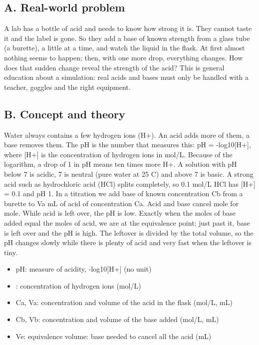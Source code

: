 \documentclass[11pt,a4paper]{article}
\begin{document}
\subsection*{A. Real-world problem}
A lab has a bottle of acid and needs to know how strong it is. They cannot taste it and the label is gone. So they add a base of known strength from a glass tube (a burette), a little at a time, and watch the liquid in the flask. At first almost nothing seems to happen; then, with one more drop, everything changes. How does that sudden change reveal the strength of the acid? This is general education about a simulation: real acids and bases must only be handled with a teacher, goggles and the right equipment.

\subsection*{B. Concept and theory}
Water always contains a few hydrogen ions (H+). An acid adds more of them, a base removes them. The pH is the number that measures this: pH = -log10[H+], where [H+] is the concentration of hydrogen ions in mol/L. Because of the logarithm, a drop of 1 in pH means ten times more H+. A solution with pH below 7 is acidic, 7 is neutral (pure water at 25 C) and above 7 is basic. A strong acid such as hydrochloric acid (HCl) splits completely, so 0.1 mol/L HCl has [H+] = 0.1 and pH 1. In a titration we add base of known concentration Cb from a burette to Va mL of acid of concentration Ca. Acid and base cancel mole for mole. While acid is left over, the pH is low. Exactly when the moles of base added equal the moles of acid, we are at the equivalence point; just past it, base is left over and the pH is high. The leftover is divided by the total volume, so the pH changes slowly while there is plenty of acid and very fast when the leftover is tiny.

\begin{itemize}[nosep]
\item pH: measure of acidity, -log10[H+] (no unit)
\item [H+]: concentration of hydrogen ions (mol/L)
\item Ca, Va: concentration and volume of the acid in the flask (mol/L, mL)
\item Cb, Vb: concentration and volume of the base added (mol/L, mL)
\item Ve: equivalence volume: base needed to cancel all the acid (mL)
\end{itemize}
\end{document}
